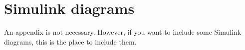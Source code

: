 \appendix

\section{Simulink diagrams}
An appendix is not necessary. However, if you want to include some Simulink diagrams, this is the place to include them.

